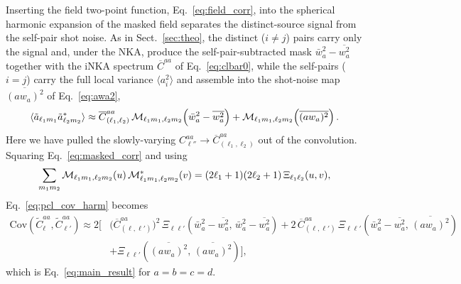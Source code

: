 \documentclass[aps,twocolumn, superscriptaddress, english, nofootinbib, 10pt]{revtex4-2}
\begin{document}
Inserting the field two-point function, Eq.~\ref{eq:field_corr}, into the spherical harmonic expansion of the masked field separates the distinct-source signal from the self-pair shot noise. As in Sect.~\ref{sec:theo}, the distinct ($i\neq j$) pairs carry only the signal and, under the NKA, produce the self-pair-subtracted mask $\bar{w}_a^2-\overline{w_a^2}$ together with the iNKA spectrum $\overline{C}^{aa}$ of Eq.~\ref{eq:clbar0}, while the self-pairs ($i=j$) carry the full local variance $\langle a_i^2\rangle$ and assemble into the shot-noise map $\overline{(aw_a)^2}$ of Eq.~\ref{eq:awa2},
\begin{equation}\label{eq:masked_corr}
    \langle\tilde{a}_{\ell_1 m_1}\tilde{a}^*_{\ell_2 m_2}\rangle \approx \overline{C}^{aa}_{(\ell_1,\ell_2)}\,{\cal M}_{\ell_1 m_1,\ell_2 m_2}\!\left(\bar{w}_a^2-\overline{w_a^2}\right) + {\cal M}_{\ell_1 m_1,\ell_2 m_2}\!\left(\overline{(aw_a)^2}\right).
\end{equation}
Here we have pulled the slowly-varying $C^{aa}_{\ell''}\to\overline{C}^{aa}_{(\ell_1,\ell_2)}$ out of the convolution. Squaring Eq.~\ref{eq:masked_corr} and using
\begin{equation}\label{eq:M2_xi}
    \sum_{m_1 m_2}{\cal M}_{\ell_1 m_1,\ell_2 m_2}(u)\,{\cal M}^*_{\ell_1 m_1,\ell_2 m_2}(v) = (2\ell_1+1)(2\ell_2+1)\,\Xi_{\ell_1\ell_2}(u,v),
\end{equation}
Eq.~\ref{eq:pcl_cov_harm} becomes
\begin{equation}\label{eq:brute_nka}
\begin{split}
    \mathrm{Cov}(\tilde{C}_{\ell}^{aa},\tilde{C}_{\ell'}^{aa}) \approx 2\Big[&\big(\overline{C}^{aa}_{(\ell,\ell')}\big)^2\,\Xi_{\ell\ell'}\!\left(\bar{w}_a^2-\overline{w_a^2},\,\bar{w}_a^2-\overline{w_a^2}\right) + 2\,\overline{C}^{aa}_{(\ell,\ell')}\,\Xi_{\ell\ell'}\!\left(\bar{w}_a^2-\overline{w_a^2},\,\overline{(aw_a)^2}\right) \\
    &+ \Xi_{\ell\ell'}\!\left(\overline{(aw_a)^2},\,\overline{(aw_a)^2}\right)\Big],
\end{split}
\end{equation}
which is Eq.~\ref{eq:main_result} for $a=b=c=d$. 
 



\twocolumngrid


\end{document}
